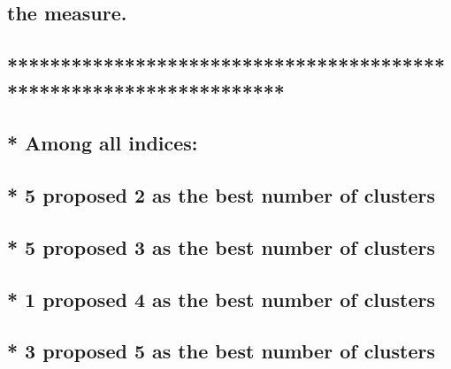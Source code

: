 \documentclass[]{article}
\begin{document}
\hypertarget{the-measure.}{%
\subsection{the measure.}\label{the-measure.}}

\hypertarget{section-1}{%
\subsection{}\label{section-1}}

\hypertarget{section-2}{%
\subsection{*******************************************************************}\label{section-2}}

\hypertarget{among-all-indices}{%
\subsection{* Among all indices:}\label{among-all-indices}}

\hypertarget{proposed-2-as-the-best-number-of-clusters}{%
\subsection{* 5 proposed 2 as the best number of
clusters}\label{proposed-2-as-the-best-number-of-clusters}}

\hypertarget{proposed-3-as-the-best-number-of-clusters}{%
\subsection{* 5 proposed 3 as the best number of
clusters}\label{proposed-3-as-the-best-number-of-clusters}}

\hypertarget{proposed-4-as-the-best-number-of-clusters}{%
\subsection{* 1 proposed 4 as the best number of
clusters}\label{proposed-4-as-the-best-number-of-clusters}}

\hypertarget{proposed-5-as-the-best-number-of-clusters}{%
\subsection{* 3 proposed 5 as the best number of
clusters}\label{proposed-5-as-the-best-number-of-clusters}}
\end{document}
